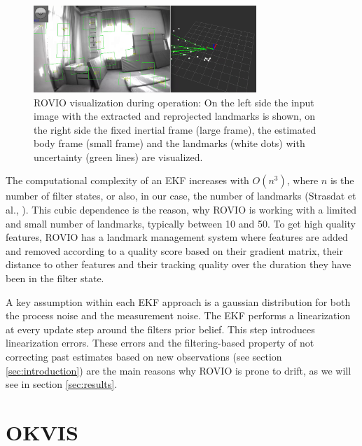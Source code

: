 \begin{figure}
   \centering
   \includegraphics[width=0.75\textwidth]{images/rovio_frontend.png}
   \caption{ROVIO visualization during operation: On the left side the input image with the extracted and reprojected landmarks is shown, on the right side the fixed inertial frame (large frame), the estimated body frame (small frame) and the landmarks (white dots) with uncertainty (green lines) are visualized.}
   \label{pics:rovio_frontend}
\end{figure}

The computational complexity of an EKF increases with $O(n^3)$, where $n$ is the number of filter states, or also, in our case, the number of landmarks (Strasdat et al., \cite{strasdat2010real}). This cubic dependence is the reason, why ROVIO is working with a limited and small number of landmarks, typically between 10 and 50. To get high quality features, ROVIO has a landmark management system where features are added and removed according to a quality score based on their gradient matrix, their distance to other features and their tracking quality over the duration they have been in the filter state. 

A key assumption within each EKF approach is a gaussian distribution for both the process noise and the measurement noise. The EKF performs a linearization at every update step around the filters prior belief. This step introduces linearization errors. These errors and the filtering-based property of not correcting past estimates based on new observations (see section \ref{sec:introduction}) are the main reasons why ROVIO is prone to drift, as we will see in section \ref{sec:results}.



\section{OKVIS}
\label{sec:okvis}

